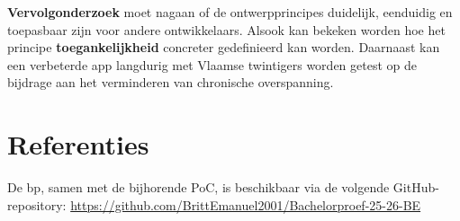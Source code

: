 \documentclass[a0,portrait]{hogent-poster}
\begin{document}
\begin{multicols}{2}
\begin{tcolorbox}[
    width=\columnwidth,
    colback=hogent-blue!10,
    colframe=hogent-blue,
    boxrule=1pt,
    arc=6pt,
    outer arc=6pt,
    left=20pt,
    right=20pt,
    top=15pt,
    bottom=15pt,
    enhanced
    ]
    \medium
    \textbf{Vervolgonderzoek} moet nagaan of de ontwerpprincipes duidelijk, eenduidig en toepasbaar zijn voor andere ontwikkelaars. Alsook kan bekeken worden hoe het principe \textbf{toegankelijkheid} concreter gedefinieerd kan worden. Daarnaast kan een verbeterde app langdurig met Vlaamse twintigers worden getest op de bijdrage aan het verminderen van chronische overspanning.
\end{tcolorbox}

\vspace{1em}

\section{Referenties}

De bp, samen met de bijhorende PoC, is beschikbaar via de volgende GitHub-repository:
\url{https://github.com/BrittEmanuel2001/Bachelorproef-25-26-BE}



\end{multicols}
\end{document}
